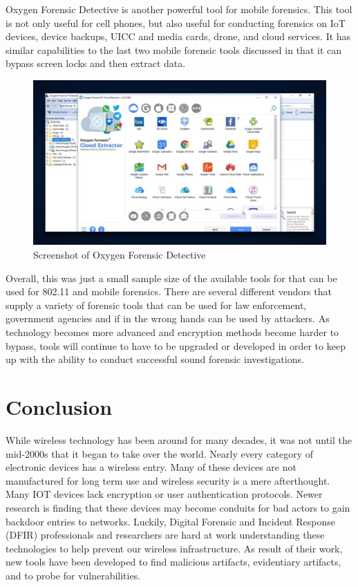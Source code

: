\documentclass[acmlarge]{acmart}
\begin{document}
Oxygen Forensic Detective is another powerful tool for mobile forensics. This tool is not only useful for cell phones, but also useful for conducting forensics on IoT devices, device backups, UICC and media cards, drone, and cloud services. It has similar capabilities to the last two mobile forensic tools discussed in that it can bypass screen locks and then extract data. 

\begin{figure}[H]
  \centering
  \includegraphics[width=0.5\linewidth]{imgs/oxygen.jpg}
  \caption{Screenshot of Oxygen Forensic Detective}
  \label{fig:oxygen}
\end{figure}
 
Overall, this was just a small sample size of the available tools for that can be used for 802.11 and mobile forensics. There are several different vendors that supply a variety of forensic tools that can be used for law enforcement, government agencies and if in the wrong hands can be used by attackers. As technology becomes more advanced and encryption methods become harder to bypass, tools will continue to have to be upgraded or developed in order to keep up with the ability to conduct successful sound forensic investigations.


\section{Conclusion}

While wireless technology has been around for many decades, it was not until the mid-2000s that it began to take over the world. Nearly every category of electronic devices has a wireless entry. Many of these devices are not manufactured for long term use and wireless security is a mere afterthought. Many IOT devices lack encryption or user authentication protocols. Newer research is finding that these devices may become conduits for bad actors to gain backdoor entries to networks. Luckily, Digital Forensic and Incident Response (DFIR) professionals and researchers are hard at work understanding these technologies to help prevent our wireless infrastructure. As result of their work, new tools have been developed to find malicious artifacts, evidentiary artifacts, and to probe for vulnerabilities. 




\end{document}
